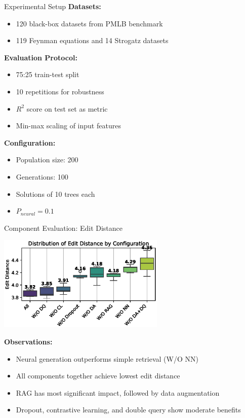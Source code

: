 \documentclass[aspectratio=1610]{beamer}
\begin{document}
    \begin{frame}{Experimental Setup}
        \textbf{Datasets:}
        \begin{itemize}
            \item 120 black-box datasets from PMLB benchmark
            \item 119 Feynman equations and 14 Strogatz datasets
        \end{itemize}

        \textbf{Evaluation Protocol:}
        \begin{itemize}
            \item 75:25 train-test split
            \item 10 repetitions for robustness
            \item $R^2$ score on test set as metric
            \item Min-max scaling of input features
        \end{itemize}

        \textbf{Configuration:}
        \begin{itemize}
            \item Population size: 200
            \item Generations: 100
            \item Solutions of 10 trees each
            \item $P_{neural} = 0.1$
        \end{itemize}
    \end{frame}

    \begin{frame}{Component Evaluation: Edit Distance}
        \begin{center}
            \includegraphics[width=0.6\textwidth]{figs/ablation_study_accuracy_10.eps}
        \end{center}

        \textbf{Observations:}
        \begin{itemize}
            \item Neural generation outperforms simple retrieval (W/O NN)
            \item All components together achieve lowest edit distance
            \item RAG has most significant impact, followed by data augmentation
            \item Dropout, contrastive learning, and double query show moderate benefits
        \end{itemize}
    \end{frame}
\end{document}
